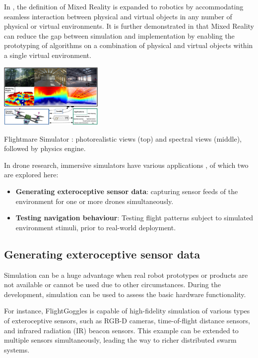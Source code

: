 In  \cite{mixed_reality_robotics}, the definition of Mixed Reality is expanded to robotics by accommodating seamless interaction between physical and virtual objects in any number of physical or virtual environments. It is further demonstrated in \cite{phan_hönig_ayanian_2018} that Mixed Reality can reduce the gap between simulation and implementation by enabling the prototyping of algorithms on a combination of physical and virtual objects within a single virtual environment.

\begin{marginfigure}%
    \includegraphics[width=5cm]{images/xr_sota/applications_flightmare.png}
    \caption{Flightmare Simulator \cite{flightmare}: photorealistic views (top) and spectral views (middle), followed by physics engine.}
\end{marginfigure}

In drone research, immersive simulators have various applications \cite{simulator_history}, of which two are explored here: 

\begin{itemize}
    \item \textbf{Generating exteroceptive sensor data}: capturing sensor feeds of the environment for one or more drones simultaneously.
    
    \item \textbf{Testing navigation behaviour}: Testing flight patterns subject to simulated environment stimuli, prior to real-world deployment.
\end{itemize}

\subsection{Generating exteroceptive sensor data}

Simulation can be a huge advantage when real robot prototypes or products are not available or cannot be used due to other circumstances. During the development, simulation can be used to assess the basic hardware functionality.

For instance, FlightGoggles is capable of high-fidelity simulation of various types of exteroceptive sensors, such as RGB-D cameras, time-of-flight distance sensors, and infrared radiation (IR) beacon sensors. This example can be extended to multiple sensors simultaneously, leading the way to richer distributed swarm systems.

